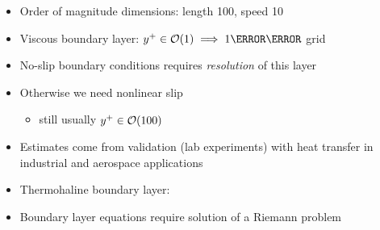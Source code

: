 \begin{frame}
\begin{columns}
\begin{column}{0.55\textwidth}
      {\large \color{blue}{$y^+$ underneath an ice shelf}}
    \begin{itemize}
    \item Order of magnitude dimensions: length \unit{100}{\meter},       speed \unit{10}{\centi\meter\per\second}
    \item Viscous boundary layer: $y^+ \in \bigO(1) \implies       \unit{1}{\milli\meter}$ grid
    \item No-slip boundary conditions requires \emph{resolution} of this       layer %
    \item Otherwise we need nonlinear slip
      \begin{itemize} \item still usually $y^+ \in \mathcal{O}(100)$       \end{itemize}
    \item Estimates come from validation (lab experiments) with heat       transfer in industrial and aerospace applications
    \item Thermohaline boundary layer: \unit{}{\meter}
    \item Boundary layer equations require solution of a Riemann problem
    \end{itemize}
   \end{column}
  \end{columns}
\end{frame}


